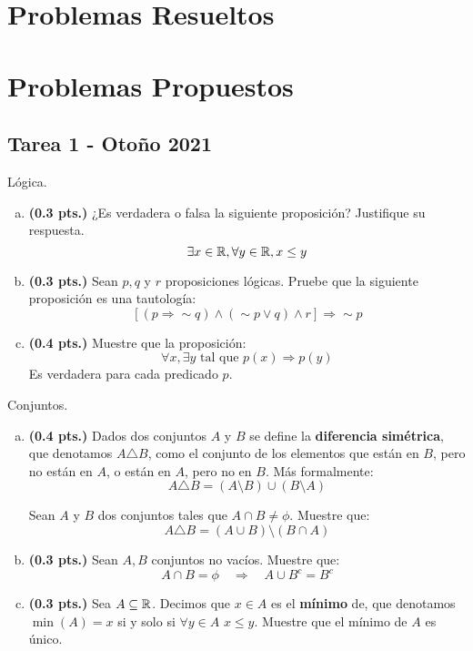 
\section{Problemas Resueltos}

\section{Problemas Propuestos}

\subsection{Tarea 1 - Otoño 2021}

\begin{problema}{Lógica.}
	\begin{enumerate}[(a)]
		\item \textbf{(0.3 pts.)} ¿Es verdadera o falsa la siguiente proposición? Justifique su respuesta. 
		$$ \exists x \in \mathbb{R} , \forall y \in \mathbb{R} , x \leq y $$ 
		
		\item \textbf{(0.3 pts.)} Sean $p, q$ y $r$ proposiciones lógicas. Pruebe que la siguiente proposición es una tautología: 
		$$ [(p \Longrightarrow \sim q) \wedge (\sim p \vee q) \wedge r ] \Longrightarrow  \sim p $$ 
		
		\item \textbf{(0.4 pts.)} Muestre que la proposición: 
		$$ \forall x , \exists y \text{ tal que } p(x) \Rightarrow p(y) $$ 
		Es verdadera para cada predicado $p$. 
	\end{enumerate}
\end{problema}

\begin{problema}{Conjuntos.}
	\begin{enumerate}[(a)]
		\item  \textbf{(0.4 pts.)} Dados dos conjuntos $A$ y $B$ se define la \textbf{diferencia simétrica}, que denotamos $A\triangle B$, como el conjunto de los elementos que están en $B$, pero no están en $A$, o están en $A$, pero no en $B$. Más formalmente: 
		$$ A \triangle B = (A \setminus B) \cup (B \setminus A) $$ 
		
		Sean $A$ y $B$ dos conjuntos tales que $A\cap B \neq \phi$. Muestre que: $$A \triangle B = (A\cup B) \setminus (B \cap A)$$
		\item \textbf{(0.3 pts.)} Sean $A, B$ conjuntos no vacíos. Muestre que: 
		$$ A\cap B = \phi \quad \Longrightarrow \quad A\cup B^c = B^c $$ 
		
		\item \textbf{(0.3 pts.)} Sea $A \subseteq \mathbb{R}$. Decimos que $x \in A$ es el \textbf{mínimo} de, que denotamos $\min(A) = x$ si y solo si $\forall y \in A$ $ x \leq y $. Muestre que el mínimo de $A$ es único. 
	\end{enumerate}
\end{problema}

